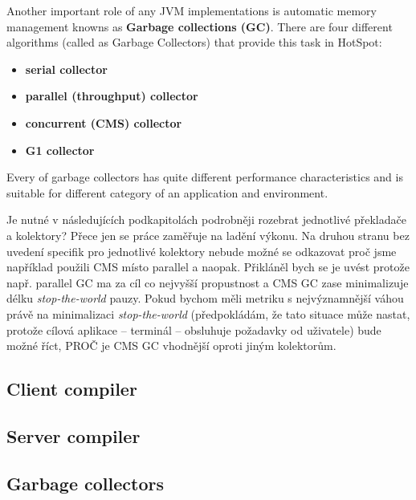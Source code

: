 \documentclass[
  digital, %
  oneside,
  notable, %
  nolof,     %
  nolot     %
]{fithesis3}
\begin{document}
Another important role of any JVM implementations is automatic memory management knowns as \textbf{Garbage collections (GC)}. There are four different algorithms (called as Garbage Collectors) that provide this task in HotSpot:
\begin{itemize}
	\item \textbf{serial collector}
	\item \textbf{parallel (throughput) collector}
	\item \textbf{concurrent (CMS) collector}
	\item \textbf{G1 collector}
\end{itemize}
Every of garbage collectors has quite different performance characteristics and is suitable for different category of an application and environment. \cite{scott}


{\color{red} Je nutné v následujících podkapitolách podrobněji rozebrat jednotlivé překladače a kolektory? Přece jen se práce zaměřuje na ladění výkonu. Na druhou stranu bez uvedení specifik pro jednotlivé kolektory nebude možné se odkazovat proč jsme například použili CMS místo parallel a naopak. Přikláněl bych se je uvést protože např. parallel GC ma za cíl co nejvyšší propustnost a CMS GC zase minimalizuje délku \textit{stop-the-world} pauzy. Pokud bychom měli metriku s nejvýznamnější váhou právě na minimalizaci \textit{stop-the-world} (předpokládám, že tato situace může nastat, protože cílová aplikace -- terminál -- obsluhuje požadavky od uživatele) bude možné říct, PROČ je CMS GC vhodnější oproti jiným kolektorům.}
\subsection{Client compiler}
\subsection{Server compiler}
\subsection{Garbage collectors}
\end{document}
